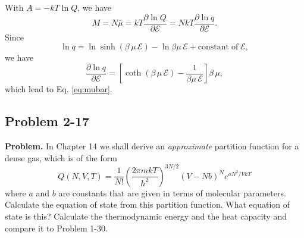 \documentclass[twocolumn, 10pt]{article}
\numberwithin{equation}{section}
\newenvironment{problem}
{\par\medskip\sffamily \color{problue}
  \textbf{Problem. }\ignorespaces}
{\medskip}
\newenvironment{solution}[1][\empty]
{\par\medskip
  \textbf{\ifx\empty#1{Solution.}\relax\else{#1}\fi} \ignorespaces}
{\medskip}
\begin{document}
\begin{solution}
With $A = -kT \ln Q$, we have
$$
M = N \bar \mu = kT \frac{ \partial \ln Q } { \partial \mathscr E }
 = N kT \frac{ \partial \ln q } { \partial \mathscr E }.
$$
Since
$$
  \ln q = \ln \sinh(\beta \, \mu \, \mathscr E)
  - \ln{ \beta \mu \, \mathscr E}
  + \mathrm{constant \; of \; \mathscr E},
$$
we have
$$
\frac{ \partial \ln q } { \partial \mathscr E }
  = \left[
    \coth(\beta \, \mu \, \mathscr E)
  - \frac{1}{ \beta \mu \, \mathscr E}
  \right] \beta \, \mu,
$$
which lead to Eq. \eqref{eq:mubar}.

\begin{figure}[h]\centering
{}
\end{figure}

\end{solution}

\subsection{Problem 2-17}

\begin{problem}
In Chapter 14 we shall derive an \emph{approximate}
partition function for a dense gas,
which is of the form
$$
  Q(N, V, T)
  =
  \frac{1}{N!}
  \left( \frac{ 2\pi m k T }{ h^2 } \right)^{3N/2}
  (V - N b)^N e^{a N^2/V k T}
$$
where $a$ and $b$ are constants that are given
in terms of molecular parameters.
%
Calculate the equation of state from this partition function.
%
What equation of state is this?
%
Calculate the thermodynamic energy and the heat capacity
and compare it to Problem 1-30.
\end{problem}
\end{document}
